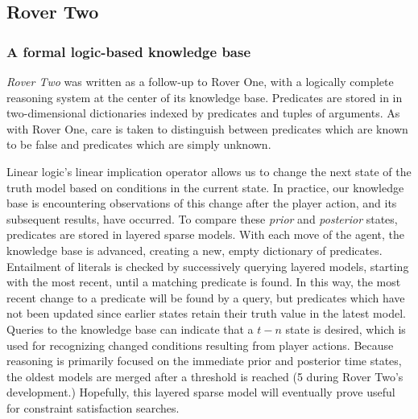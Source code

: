 \subsection{Rover Two}

\subsubsection{A formal logic-based knowledge base}

\emph{Rover Two} was written as a follow-up to Rover One, with a
logically complete reasoning system at the center of its knowledge base.
Predicates are stored in in two-dimensional dictionaries indexed by
predicates and tuples of arguments. As with Rover One, care is taken to
distinguish between predicates which are known to be false and
predicates which are simply unknown.

Linear logic's linear implication operator allows us to change the next
state of the truth model based on conditions in the current state. In
practice, our knowledge base is encountering observations of this change
after the player action, and its subsequent results, have occurred. To
compare these \emph{prior} and \emph{posterior} states, predicates are
stored in layered sparse models. With each move of the agent, the
knowledge base is advanced, creating a new, empty dictionary of
predicates.  Entailment of literals is checked by successively querying
layered models, starting with the most recent, until a matching
predicate is found. In this way, the most recent change to a predicate
will be found by a query, but predicates which have not been updated
since earlier states retain their truth value in the latest model.
Queries to the knowledge base can indicate that a $t-n$ state is
desired, which is used for recognizing changed conditions resulting from
player actions. Because reasoning is primarily focused on the immediate
prior and posterior time states, the oldest models are merged after a
threshold is reached (5 during Rover Two's development.) Hopefully, this
layered sparse model will eventually prove useful for constraint
satisfaction searches.

